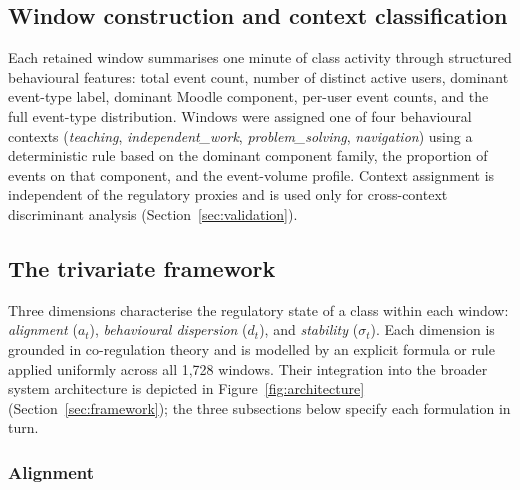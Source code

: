 \documentclass[preprint,12pt,authoryear]{elsarticle}
\begin{document}
\subsection{Window construction and context classification}
\label{sec:windows}

Each retained window summarises one minute of class activity through structured behavioural features: total event count, number of distinct active users, dominant event-type label, dominant Moodle component, per-user event counts, and the full event-type distribution. Windows were assigned one of four behavioural contexts (\textit{teaching}, \textit{independent\_work}, \textit{problem\_solving}, \textit{navigation}) using a deterministic rule based on the dominant component family, the proportion of events on that component, and the event-volume profile. Context assignment is independent of the regulatory proxies and is used only for cross-context discriminant analysis (Section~\ref{sec:validation}).

\subsection{The trivariate framework}
\label{sec:proxies}

Three dimensions characterise the regulatory state of a class within each window: \textit{alignment} ($a_t$), \textit{behavioural dispersion} ($d_t$), and \textit{stability} ($\sigma_t$). Each dimension is grounded in co-regulation theory \citep{hadwin2018,jarvela2021,malmberg2017} and is modelled by an explicit formula or rule applied uniformly across all 1{,}728 windows. Their integration into the broader system architecture is depicted in Figure~\ref{fig:architecture} (Section~\ref{sec:framework}); the three subsections below specify each formulation in turn.

\subsubsection{Alignment}
\label{sec:proxy-alignment}
\end{document}
